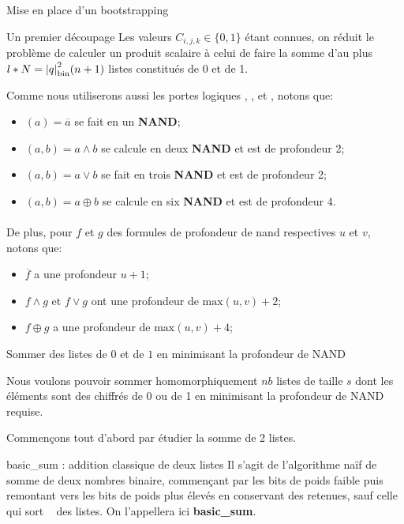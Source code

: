 \begin{section}{Mise en place d'un bootstrapping}
\begin{subsection}{Un premier découpage}
	Les valeurs $C_{i,j,k} \in \{0,1\}$ étant connues, on réduit le problème de
	calculer un produit scalaire à celui de faire la somme d'au plus $l * N
	= {|q|}_{\text{bin}}^2 (n+1)$ listes constitués de 0 et de 1.

	Comme nous utiliserons aussi les portes logiques , ,  et , notons que:
\begin{itemize}
\item {}$(a) = \overline{a}$ se fait en un \textbf{NAND};
\item {}$(a, b) = a \land b$ se calcule en deux \textbf{NAND} et est de
	profondeur 2;
\item {}$(a, b) = a \lor b$ se fait en trois \textbf{NAND} et est de
	profondeur 2;
\item {}$(a, b) = a \oplus b$ se calcule en six \textbf{NAND} et est de
	profondeur 4.
\end{itemize}

\paragraph{}
De plus, pour $f$ et $g$ des formules de profondeur de nand respectives $u$ et
$v$, notons que:
\begin{itemize}
\item $\overline{f}$ a une profondeur $u+1$;
\item $f \land g$ et $f \lor g$ ont une profondeur de $\text{max}(u,v) + 2$;
\item $f \oplus g$ a une profondeur de $\text{max}(u,v) + 4$;
\end{itemize}
\end{subsection}
\begin{subsection}{Sommer des listes de $0$ et de $1$ en minimisant la profondeur de NAND}

	Nous voulons pouvoir sommer homomorphiquement $nb$ listes de taille $s$ dont les éléments sont des chiffrés de 0 ou de 1 en minimisant la profondeur de NAND requise. 

Commençons tout d'abord par étudier la somme de 2 listes.

\begin{subsubsection}{basic\_sum : addition classique de deux listes}
	Il s'agit de l'algorithme naïf de somme de deux nombres binaire, commençant par les bits de poids faible puis remontant vers les bits de poids plus élevés en conservant des retenues, sauf celle qui \og sort \fg~ des listes. On l'appellera ici \textbf{basic\_sum}. 
	

\end{subsubsection}
\end{subsection}
\end{section}
